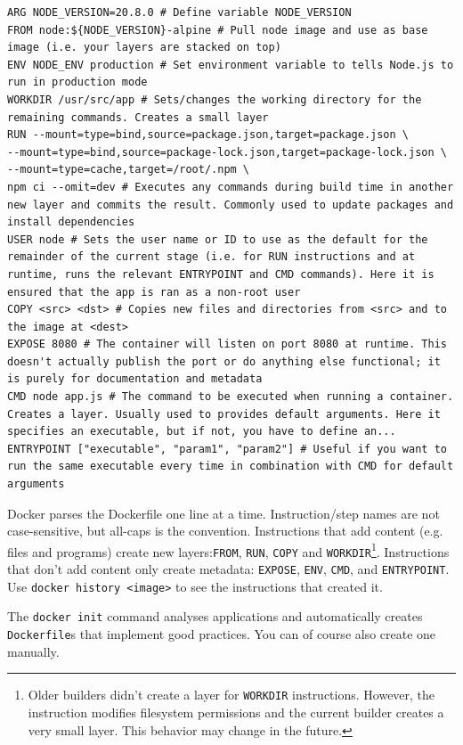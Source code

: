 \documentclass[table, xcdraw]{article}%
\begin{document}
\begin{verbatim}
ARG NODE_VERSION=20.8.0 # Define variable NODE_VERSION
FROM node:${NODE_VERSION}-alpine # Pull node image and use as base image (i.e. your layers are stacked on top)
ENV NODE_ENV production # Set environment variable to tells Node.js to run in production mode
WORKDIR /usr/src/app # Sets/changes the working directory for the remaining commands. Creates a small layer
RUN --mount=type=bind,source=package.json,target=package.json \
--mount=type=bind,source=package-lock.json,target=package-lock.json \
--mount=type=cache,target=/root/.npm \
npm ci --omit=dev # Executes any commands during build time in another new layer and commits the result. Commonly used to update packages and install dependencies
USER node # Sets the user name or ID to use as the default for the remainder of the current stage (i.e. for RUN instructions and at runtime, runs the relevant ENTRYPOINT and CMD commands). Here it is ensured that the app is ran as a non-root user
COPY <src> <dst> # Copies new files and directories from <src> and to the image at <dest>
EXPOSE 8080 # The container will listen on port 8080 at runtime. This doesn't actually publish the port or do anything else functional; it is purely for documentation and metadata
CMD node app.js # The command to be executed when running a container. Creates a layer. Usually used to provides default arguments. Here it specifies an executable, but if not, you have to define an...
ENTRYPOINT ["executable", "param1", "param2"] # Useful if you want to run the same executable every time in combination with CMD for default arguments
\end{verbatim}

Docker parses the Dockerfile one line at a time. Instruction/step names are not case-sensitive, but all-caps is the convention. Instructions that add content (e.g. files and programs) create new layers:\texttt{FROM}, \texttt{RUN}, \texttt{COPY} and \texttt{WORKDIR}\footnote{Older builders didn’t create a layer for \texttt{WORKDIR} instructions. However, the instruction modifies filesystem permissions and the current builder creates a very small layer. This behavior may change in the future.}. Instructions that don’t add content only create metadata: \texttt{EXPOSE}, \texttt{ENV}, \texttt{CMD}, and \texttt{ENTRYPOINT}. Use \texttt{docker history <image>} to see the instructions that created it. 

The \texttt{docker init} command analyses applications and automatically creates \texttt{Dockerfile}s that implement good practices. You can of course also create one manually.
\end{document}
